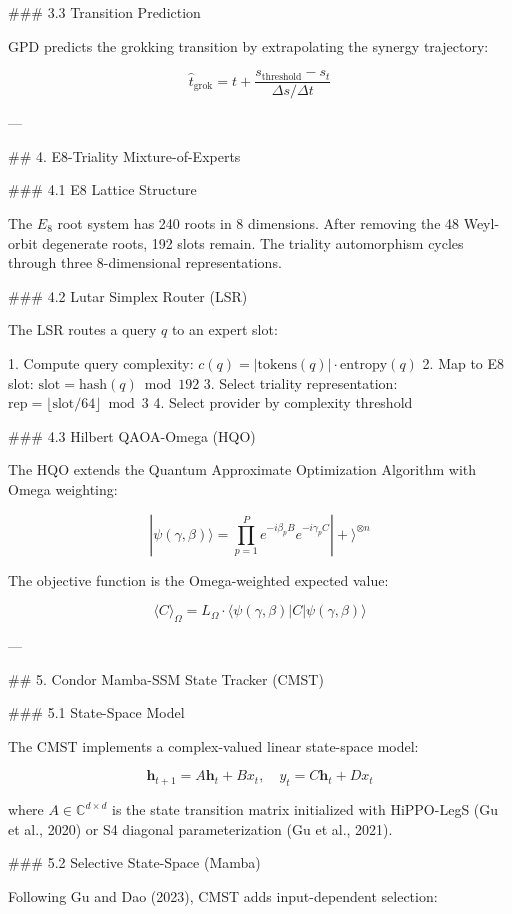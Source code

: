 ### 3.3 Transition Prediction

GPD predicts the grokking transition by extrapolating the synergy trajectory:

\[
\hat{t}_{\text{grok}} = t + \frac{s_{\text{threshold}} - s_t}{\Delta s / \Delta t}
\]

---

## 4. E8-Triality Mixture-of-Experts

### 4.1 E8 Lattice Structure

The \( E_8 \) root system has 240 roots in 8 dimensions. After removing the 48 Weyl-orbit degenerate roots, 192 slots remain. The triality automorphism cycles through three 8-dimensional representations.

### 4.2 Lutar Simplex Router (LSR)

The LSR routes a query \( q \) to an expert slot:

1. Compute query complexity: \( c(q) = |\text{tokens}(q)| \cdot \text{entropy}(q) \)
2. Map to E8 slot: \( \text{slot} = \text{hash}(q) \bmod 192 \)
3. Select triality representation: \( \text{rep} = \lfloor \text{slot} / 64 \rfloor \bmod 3 \)
4. Select provider by complexity threshold

### 4.3 Hilbert QAOA-Omega (HQO)

The HQO extends the Quantum Approximate Optimization Algorithm with Omega weighting:

\[
|\psi(\gamma, \beta)\rangle = \prod_{p=1}^{P} e^{-i\beta_p B} e^{-i\gamma_p C} |+\rangle^{\otimes n}
\]

The objective function is the Omega-weighted expected value:

\[
\langle C \rangle_\Omega = L_\Omega \cdot \langle \psi(\gamma, \beta) | C | \psi(\gamma, \beta) \rangle
\]

---

## 5. Condor Mamba-SSM State Tracker (CMST)

### 5.1 State-Space Model

The CMST implements a complex-valued linear state-space model:

\[
\mathbf{h}_{t+1} = A \mathbf{h}_t + B x_t, \quad y_t = C \mathbf{h}_t + D x_t
\]

where \( A \in \mathbb{C}^{d \times d} \) is the state transition matrix initialized with HiPPO-LegS (Gu et al., 2020) or S4 diagonal parameterization (Gu et al., 2021).

### 5.2 Selective State-Space (Mamba)

Following Gu and Dao (2023), CMST adds input-dependent selection:

